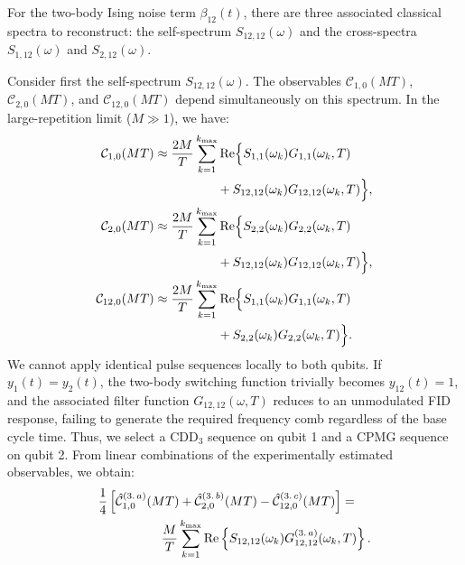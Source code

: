 \documentclass[%
 reprint,
superscriptaddress,
 amsmath,amssymb,
 aps,
pra,
]{revtex4-2}
\begin{document}
For the two-body Ising noise term $\beta_{12}(t)$, there are three associated classical spectra to reconstruct: the self-spectrum $S_{12,12}(\omega)$ and the cross-spectra $S_{1,12}(\omega)$ and $S_{2,12}(\omega)$.

Consider first the self-spectrum $S_{12,12}(\omega)$. The observables $\mathcal{C}_{1,0}(MT)$, $\mathcal{C}_{2,0}(MT)$, and $\mathcal{C}_{12,0}(MT)$ depend simultaneously on this spectrum. In the large-repetition limit ($M\gg 1$), we have:
\begin{align}
    \mathcal{C}_{1,0}(MT)&\approx\frac{2M}{T}\sum^{k_{\max}}_{k=1} \text{Re}\Big\{S_{1,1}(\omega_k)G_{1,1}(\omega_k, T)\notag\\
    &\qquad\qquad\quad+S_{12,12}(\omega_k)G_{12,12}(\omega_k, T)\Big\},\\
    \mathcal{C}_{2,0}(MT)&\approx\frac{2M}{T}\sum^{k_{\max}}_{k=1} \text{Re}\Big\{S_{2,2}(\omega_k)G_{2,2}(\omega_k, T)\notag\\
    &\qquad\qquad\quad+S_{12,12}(\omega_k)G_{12,12}(\omega_k, T)\Big\},\\
    \mathcal{C}_{12,0}(MT)&\approx\frac{2M}{T}\sum^{k_{\max}}_{k=1} \text{Re}\Big\{S_{1,1}(\omega_k)G_{1,1}(\omega_k, T)\notag\\
    &\qquad\qquad\quad+S_{2,2}(\omega_k)G_{2,2}(\omega_k, T)\Big\}.
\end{align}
We cannot apply identical pulse sequences locally to both qubits. If $y_1(t) = y_2(t)$, the two-body switching function trivially becomes $y_{12}(t) = 1$, and the associated filter function $G_{12,12}(\omega, T)$ reduces to an unmodulated FID response, failing to generate the required frequency comb regardless of the base cycle time. Thus, we select a $\text{CDD}_3$ sequence on qubit 1 and a CPMG sequence on qubit 2. From linear combinations of the experimentally estimated observables, we obtain:
\begin{align}
    &\frac{1}{4}\left[\hat{\mathcal{C}}_{1,0}^{(3.\,a)}(MT)+\hat{\mathcal{C}}_{2,0}^{(3.\,b)}(MT)-\hat{\mathcal{C}}_{12,0}^{(3.\,c)}(MT)\right]=\notag\\
    &\qquad\qquad\quad\frac{M}{T}\sum^{k_{\max}}_{k=1} \text{Re}\left\{S_{12,12}(\omega_k)G^{(3.\,a)}_{12,12}(\omega_k, T)\right\}.
\end{align}
\end{document}
